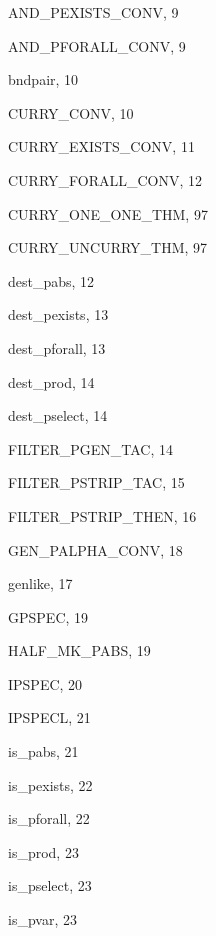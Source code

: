 \begin{theindex}

  \item {\ptt AND\_PEXISTS\_CONV}, 9
  \item {\ptt AND\_PFORALL\_CONV}, 9

  \indexspace

  \item {\ptt bndpair}, 10

  \indexspace

  \item {\ptt CURRY\_CONV}, 10
  \item {\ptt CURRY\_EXISTS\_CONV}, 11
  \item {\ptt CURRY\_FORALL\_CONV}, 12
  \item {\ptt CURRY\_ONE\_ONE\_THM}, 97
  \item {\ptt CURRY\_UNCURRY\_THM}, 97

  \indexspace

  \item {\ptt dest\_pabs}, 12
  \item {\ptt dest\_pexists}, 13
  \item {\ptt dest\_pforall}, 13
  \item {\ptt dest\_prod}, 14
  \item {\ptt dest\_pselect}, 14

  \indexspace

  \item {\ptt FILTER\_PGEN\_TAC}, 14
  \item {\ptt FILTER\_PSTRIP\_TAC}, 15
  \item {\ptt FILTER\_PSTRIP\_THEN}, 16

  \indexspace

  \item {\ptt GEN\_PALPHA\_CONV}, 18
  \item {\ptt genlike}, 17
  \item {\ptt GPSPEC}, 19

  \indexspace

  \item {\ptt HALF\_MK\_PABS}, 19

  \indexspace

  \item {\ptt IPSPEC}, 20
  \item {\ptt IPSPECL}, 21
  \item {\ptt is\_pabs}, 21
  \item {\ptt is\_pexists}, 22
  \item {\ptt is\_pforall}, 22
  \item {\ptt is\_prod}, 23
  \item {\ptt is\_pselect}, 23
  \item {\ptt is\_pvar}, 23


\end{theindex}
